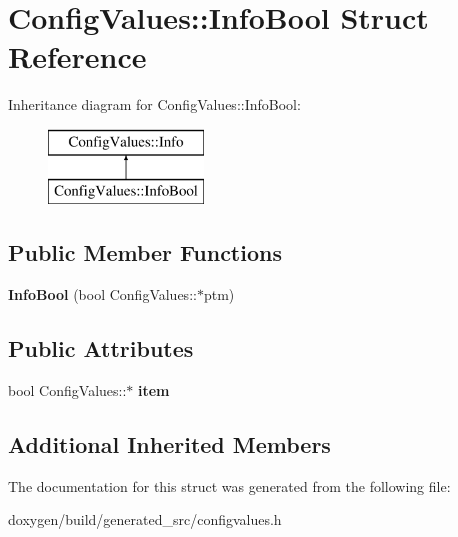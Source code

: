 \hypertarget{struct_config_values_1_1_info_bool}{}\section{Config\+Values\+::Info\+Bool Struct Reference}
\label{struct_config_values_1_1_info_bool}
Inheritance diagram for Config\+Values\+::Info\+Bool\+:\begin{figure}[H]
\begin{center}
\leavevmode
\includegraphics[height=2.000000cm]{struct_config_values_1_1_info_bool}
\end{center}
\end{figure}
\subsection*{Public Member Functions}
\begin{DoxyCompactItemize}
\item 
\mbox{\label{struct_config_values_1_1_info_bool_a305130d78f5093d1deab788fd47f2538}} 
{\bfseries Info\+Bool} (bool Config\+Values\+::$\ast$ptm)
\end{DoxyCompactItemize}
\subsection*{Public Attributes}
\begin{DoxyCompactItemize}
\item 
\mbox{\label{struct_config_values_1_1_info_bool_a3fb08cb4b674369c8ace26608e795d35}} 
bool Config\+Values\+::$\ast$ {\bfseries item}
\end{DoxyCompactItemize}
\subsection*{Additional Inherited Members}


The documentation for this struct was generated from the following file\+:\begin{DoxyCompactItemize}
\item 
doxygen/build/generated\+\_\+src/configvalues.\+h\end{DoxyCompactItemize}
